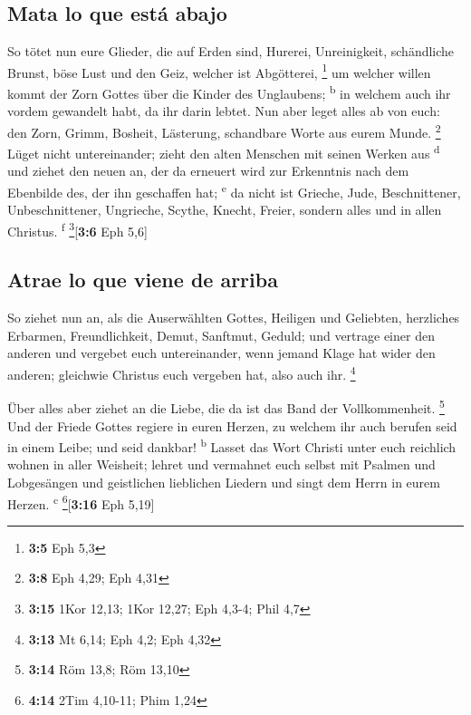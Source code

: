 \hypertarget{mata-lo-que-estuxe1-abajo}{%
\subsection{Mata lo que está abajo}\label{mata-lo-que-estuxe1-abajo}}

 So tötet nun eure Glieder, die auf Erden sind, Hurerei,
Unreinigkeit, schändliche Brunst, böse Lust und den Geiz, welcher ist
Abgötterei, \footnote{\textbf{3:5} Eph 5,3}  um welcher
willen kommt der Zorn Gottes über die Kinder des Unglaubens;
\textsuperscript{b}  in welchem auch ihr vordem gewandelt
habt, da ihr darin lebtet.  Nun aber leget alles ab von
euch: den Zorn, Grimm, Bosheit, Lästerung, schandbare Worte aus eurem
Munde. \footnote{\textbf{3:8} Eph 4,29; Eph 4,31}  Lüget
nicht untereinander; zieht den alten Menschen mit seinen Werken aus
\textsuperscript{d}  und ziehet den neuen an, der da
erneuert wird zur Erkenntnis nach dem Ebenbilde des, der ihn geschaffen
hat; \textsuperscript{e}  da nicht ist Grieche, Jude,
Beschnittener, Unbeschnittener, Ungrieche, Scythe, Knecht, Freier,
sondern alles und in allen Christus. \textsuperscript{f}
\footnote{\textbf{3:15} 1Kor 12,13; 1Kor 12,27; Eph 4,3-4; Phil 4,7}{[}\textbf{3:6}
Eph 5,6{]}

\hypertarget{atrae-lo-que-viene-de-arriba}{%
\subsection{Atrae lo que viene de
arriba}\label{atrae-lo-que-viene-de-arriba}}

 So ziehet nun an, als die Auserwählten Gottes, Heiligen
und Geliebten, herzliches Erbarmen, Freundlichkeit, Demut, Sanftmut,
Geduld;  und vertrage einer den anderen und vergebet euch
untereinander, wenn jemand Klage hat wider den anderen; gleichwie
Christus euch vergeben hat, also auch ihr. \footnote{\textbf{3:13} Mt
  6,14; Eph 4,2; Eph 4,32}

 Über alles aber ziehet an die Liebe, die da ist das Band
der Vollkommenheit. \footnote{\textbf{3:14} Röm 13,8; Röm 13,10}
 Und der Friede Gottes regiere in euren Herzen, zu
welchem ihr auch berufen seid in einem Leibe; und seid dankbar!
\textsuperscript{b}  Lasset das Wort Christi unter euch
reichlich wohnen in aller Weisheit; lehret und vermahnet euch selbst mit
Psalmen und Lobgesängen und geistlichen lieblichen Liedern und singt dem
Herrn in eurem Herzen. \textsuperscript{c} \footnote{\textbf{4:14} 2Tim
  4,10-11; Phim 1,24}{[}\textbf{3:16} Eph 5,19{]}

